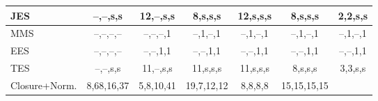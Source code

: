 \begin{table}[htbp!]
\begin{tabular}{|l|c|c|c|c|c|c|}
   \hline JES             & --,--,s,s   & 12,--,s,s   & 8,s,s,s     & 12,s,s,s    & 8,s,s,s     & 2,2,s,s     \\
   \hline MMS             & --,--,--,-- & --,--,--,1  & --,1,--,1   & --,1,--,1   & --,1,--,1   & --,1,--,1   \\
   \hline EES             & --,--,--,-- & --,--,1,1   & --,--,1,1   & --,--,1,1   & --,--,1,1   & --,--,1,1   \\
   \hline TES             & --,--,s,s   & 11,--,s,s   & 11,s,s,s    & 11,s,s,s    & 8,s,s,s     & 3,3,s,s     \\
   \hline Closure+Norm.   & 8,68,16,37  & 5,8,10,41   & 19,7,12,12  & 8,8,8,8     & 15,15,15,15 &             \\
   \hline \hline
 \end{tabular}
 \label{table:SystematicsTable}
\end{table}

